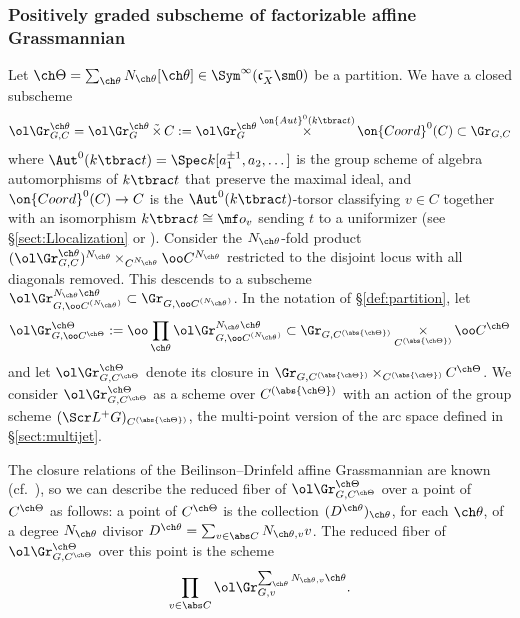 \documentclass[final]{amsart}
\theoremstyle{remark}
\theoremstyle{definition}
\DeclareMathOperator*{\ttimes}{\tilde\times}
\DeclareMathOperator*{\xt}{\times}
\numberwithin{equation}{section}
\begin{document}
\subsubsection{Positively graded subscheme of factorizable affine Grassmannian}\label{sect:strata-Grassmannian}
Let $\ch\Theta = \sum_{\ch\theta} N_{\ch\theta} 
[\ch\theta] \in \Sym^\infty(\mathfrak c_X^- \sm 0)$ 
be a partition. We have a closed 
subscheme
\[ \ol\Gr^{\ch\theta}_{G,C} = \ol\Gr_G^{\ch\theta} \ttimes C := \ol\Gr_G^{\ch\theta} \xt^{\on{Aut}^0( k\tbrac t )} \on{Coord}^0(C) \subset \Gr_{G,C} \] 
where $\Aut^0(k\tbrac t) = \Spec k[a_1^{\pm 1}, a_2,\dotsc]$ is the group scheme of algebra automorphisms of $k\tbrac t$ that preserve the maximal ideal, and $\on{Coord}^0(C)\to C$ is the $\Aut^0(k\tbrac t)$-torsor classifying $v\in C$ together with an isomorphism $k\tbrac t \cong \mf o_v$ sending $t$ to a uniformizer 
(see \S\ref{sect:Llocalization} or \cite[(3.1.11)]{Xinwen}).
Consider the $N_{\ch\theta}$-fold product $(\ol\Gr_{G,C}^{\ch\theta})^{N_{\ch\theta}} \xt_{C^{N_{\ch\theta}}} {\oo C^{N_{\ch\theta}}}$ restricted to the disjoint locus with all diagonals removed. 
This descends to a subscheme $\ol\Gr^{N_{\ch\theta}\ch\theta}_{G, \oo C^{(N_{\ch\theta})}} \subset \Gr_{G, \oo C^{(N_{\ch\theta})}}$. 
In the notation of \S\ref{def:partition}, let 
\[ \ol\Gr^{\ch\Theta}_{G, \oo C^{\ch\Theta}} := \oo\prod_{\ch\theta} \ol\Gr^{N_{\ch\theta}\ch\theta}_{G, \oo C^{(N_{\ch\theta})}} 
\subset \Gr_{G, C^{(\abs{\ch\Theta})}} \xt_{C^{(\abs{\ch\Theta})}} 
\oo C^{\ch\Theta} \]
and let $\ol\Gr^{\ch\Theta}_{G,C^{\ch\Theta}}$ denote its closure 
in $\Gr_{G,C^{(\abs{\ch\Theta})}} \xt_{C^{(\abs{\ch\Theta})}} C^{\ch\Theta}$.
We consider $\ol\Gr^{\ch\Theta}_{G, C^{\ch\Theta}}$ as a scheme 
over $C^{(\abs{\ch\Theta})}$ with an action of the group scheme 
$(\Scr L^+ G)_{C^{(\abs{\ch\Theta})}}$, the multi-point version of the arc space 
defined in \S\ref{sect:multijet}. 

\medskip

The closure relations of the Beilinson--Drinfeld affine Grassmannian 
are known (cf.~\cite[Proposition 3.1.14]{Xinwen}), so we can describe
the reduced fiber of $\ol\Gr^{\ch\Theta}_{G,C^{\ch\Theta}}$ 
over a point of $C^{\ch\Theta}$ as follows: 
a point of $C^{\ch\Theta}$ is the collection $(D^{\ch\theta})_{\ch\theta}$, 
for each $\ch\theta$,
of a degree $N_{\ch\theta}$ divisor 
$D^{\ch\theta} = \sum_{v\in \abs C} N_{\ch\theta,v} v$. 
The reduced fiber of $\ol\Gr^{\ch\Theta}_{G,C^{\ch\Theta}}$ 
over this point is the scheme
\begin{equation} \label{e:GrTheta-fiber}
\prod_{v\in \abs C} \ol\Gr^{\sum_{\ch\theta} N_{\ch\theta,v}\ch\theta}_{G,v}. 
\end{equation}
\end{document}
